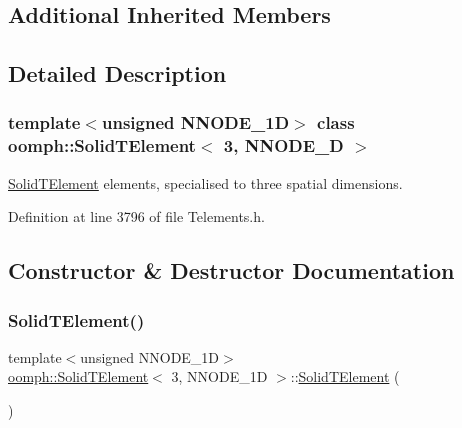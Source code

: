 \subsection*{Additional Inherited Members}


\subsection{Detailed Description}
\subsubsection*{template$<$unsigned N\+N\+O\+D\+E\+\_\+1D$>$\newline
class oomph\+::\+Solid\+T\+Element$<$ 3, N\+N\+O\+D\+E\+\_\+D $>$}

\hyperlink{classoomph_1_1SolidTElement}{Solid\+T\+Element} elements, specialised to three spatial dimensions. 

Definition at line 3796 of file Telements.\+h.



\subsection{Constructor \& Destructor Documentation}
\mbox{\label{classoomph_1_1SolidTElement_3_013_00_01NNODE__1D_01_4_a0413a0020346b450c098eab0f0f4d33f}} 
\subsubsection{\texorpdfstring{Solid\+T\+Element()}{SolidTElement()}\hspace{0.1cm}{\footnotesize\ttfamily [1/2]}}
{\footnotesize\ttfamily template$<$unsigned N\+N\+O\+D\+E\+\_\+1D$>$ \\
\hyperlink{classoomph_1_1SolidTElement}{oomph\+::\+Solid\+T\+Element}$<$ 3, N\+N\+O\+D\+E\+\_\+1D $>$\+::\hyperlink{classoomph_1_1SolidTElement}{Solid\+T\+Element} (\begin{DoxyParamCaption}{ }\end{DoxyParamCaption})\hspace{0.3cm}{\ttfamily [inline]}}



